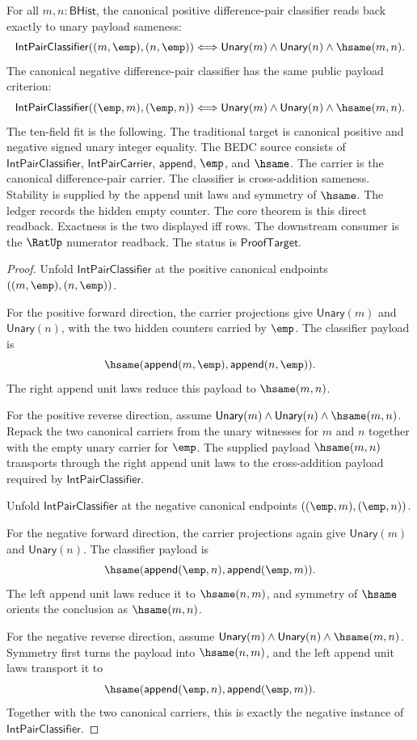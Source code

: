 \begin{theorem}
\label{thm:int-canonical-same-sign-pair-readback}
For all $m,n:\mathsf{BHist}$, the canonical positive difference-pair
classifier reads back exactly to unary payload sameness:
$$
\mathsf{IntPairClassifier}((m,\emp),(n,\emp))
\Longleftrightarrow
\mathsf{Unary}(m)\land\mathsf{Unary}(n)\land\hsame(m,n).
$$
The canonical negative difference-pair classifier has the same public payload
criterion:
$$
\mathsf{IntPairClassifier}((\emp,m),(\emp,n))
\Longleftrightarrow
\mathsf{Unary}(m)\land\mathsf{Unary}(n)\land\hsame(m,n).
$$
The ten-field fit is the following. The traditional target is canonical
positive and negative signed unary integer equality. The BEDC source consists
of $\mathsf{IntPairClassifier}$, $\mathsf{IntPairCarrier}$, $\mathsf{append}$,
$\emp$, and $\hsame$. The carrier is the canonical difference-pair carrier.
The classifier is cross-addition sameness. Stability is supplied by the append
unit laws and symmetry of $\hsame$. The ledger records the hidden empty
counter. The core theorem is this direct readback. Exactness is the two
displayed iff rows. The downstream consumer is the $\RatUp$ numerator
readback. The status is $\mathsf{ProofTarget}$.
\end{theorem}
\begin{proof}
Unfold $\mathsf{IntPairClassifier}$ at the positive canonical endpoints
$((m,\emp),(n,\emp))$.

For the positive forward direction, the carrier projections give
$\mathsf{Unary}(m)$ and $\mathsf{Unary}(n)$, with the two hidden counters
carried by $\emp$. The classifier payload is
$$
\hsame(\mathsf{append}(m,\emp),\mathsf{append}(n,\emp)).
$$
The right append unit laws reduce this payload to $\hsame(m,n)$.

For the positive reverse direction, assume
$\mathsf{Unary}(m)\land\mathsf{Unary}(n)\land\hsame(m,n)$. Repack the two
canonical carriers from the unary witnesses for $m$ and $n$ together with the
empty unary carrier for $\emp$. The supplied payload $\hsame(m,n)$ transports
through the right append unit laws to the cross-addition payload required by
$\mathsf{IntPairClassifier}$.

Unfold $\mathsf{IntPairClassifier}$ at the negative canonical endpoints
$((\emp,m),(\emp,n))$.

For the negative forward direction, the carrier projections again give
$\mathsf{Unary}(m)$ and $\mathsf{Unary}(n)$. The classifier payload is
$$
\hsame(\mathsf{append}(\emp,n),\mathsf{append}(\emp,m)).
$$
The left append unit laws reduce it to $\hsame(n,m)$, and symmetry of
$\hsame$ orients the conclusion as $\hsame(m,n)$.

For the negative reverse direction, assume
$\mathsf{Unary}(m)\land\mathsf{Unary}(n)\land\hsame(m,n)$. Symmetry first
turns the payload into $\hsame(n,m)$, and the left append unit laws transport
it to
$$
\hsame(\mathsf{append}(\emp,n),\mathsf{append}(\emp,m)).
$$
Together with the two canonical carriers, this is exactly the negative
instance of $\mathsf{IntPairClassifier}$.
\end{proof}

